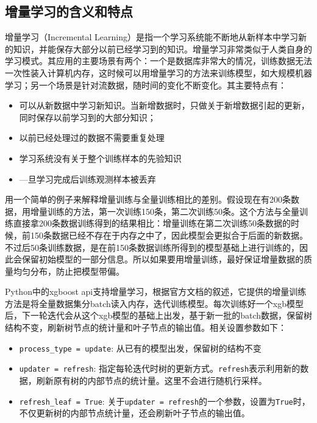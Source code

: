 \subsection{增量学习的含义和特点}
增量学习（Incremental Learning）\cite{zhong2017survey}是指一个学习系统能不断地从新样本中学习新的知识，并能保存大部分以前已经学习到的知识。增量学习非常类似于人类自身的学习模式。其应用的主要场景有两个：一个是数据库非常大的情况，训练数据无法一次性装入计算机内存，这时候可以用增量学习的方法来训练模型，如大规模机器学习；另一个场景是针对流数据，随时间的变化不断变化。其主要特点有：
\begin{itemize}
	\item 可以从新数据中学习新知识。当新增数据时，只做关于新增数据引起的更新，同时保存以前学习到的大部分知识；
	\item 以前已经处理过的数据不需要重复处理
	\item 学习系统没有关于整个训练样本的先验知识
	\item —旦学习完成后训练观测样本被丢弃
\end{itemize}

用一个简单的例子来解释增量训练与全量训练相比的差别。假设现在有200条数据，用增量训练的方法，第一次训练150条，第二次训练50条。这个方法与全量训练直接拿200条数据训练得到的结果相比：增量训练在第二次训练50条数据的时候，前150条数据已经不存在于内存之中了，因此模型会更拟合于后面的新数据。不过后50条训练数据，是在前150条数据训练所得到的模型基础上进行训练的，因此会保留初始模型的一部分信息。所以如果要用增量训练，最好保证增量数据的质量均匀分布，防止把模型带偏。

Python中的xgboost api支持增量学习，根据官方文档的叙述，它提供的增量训练方法是将全量数据集分batch读入内存，迭代训练模型。每次训练好一个xgb模型后，下一轮迭代会从这个xgb模型的基础上出发，基于新一批的batch数据，保留树结构不变，刷新树节点的统计量和叶子节点的输出值。相关设置参数如下：
\begin{itemize}
	\item \texttt{process_type = update}: 从已有的模型出发，保留树的结构不变
	\item \texttt{updater = refresh}: 指定每轮迭代时树的更新方式。\texttt{refresh}表示利用新的数据，刷新原有树的内部节点的统计量。这里不会进行随机行采样。
	\item \texttt{refresh_leaf = True}: 关于\texttt{updater = refresh}的一个参数，设置为\texttt{True}时，不仅更新树的内部节点统计量，还会刷新叶子节点的输出值。
\end{itemize}

